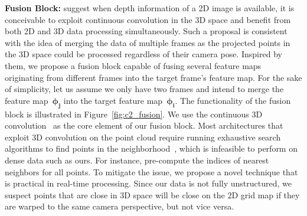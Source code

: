 \bigbreak\noindent\textbf{Fusion Block:} \cite{chen2019learning} suggest when depth information of a 2D image is available, it is conceivable to exploit continuous convolution in the 3D space and benefit from both 2D and 3D data processing simultaneously. Such a proposal is consistent with the idea of merging the data of multiple frames as the projected points in the 3D space could be processed regardless of their camera pose. Inspired by them, we propose a fusion block capable of fusing several feature maps originating from different frames into the target frame's feature map. For the sake of simplicity, let us assume we only have two frames and intend to merge the feature map~$\boldsymbol{\phi_j}$ into the target feature map~$\boldsymbol{\phi_i}$. The functionality of the fusion block is illustrated in Figure~\ref{fig:c2_fusion}. We use the continuous 3D convolution~\citep{wang2018deep} as the core element of our fusion block. Most architectures that exploit 3D convolution on the point cloud require running exhaustive search algorithms to find points in the neighborhood~\citep{chen2019learning, li2018pointcnn, xu2018spidercnn, wu2019pointconv, boulch2020convpoint, wang2018deep}, which is infeasible to perform on dense data such as ours. For instance, \cite{chen2019learning} pre-compute the indices of nearest neighbors for all points. To mitigate the issue, we propose a novel technique that is practical in real-time processing. Since our data is not fully unstructured, we suspect points that are close in 3D space will be close on the 2D grid map if they are warped to the same camera perspective, but not vice versa.


